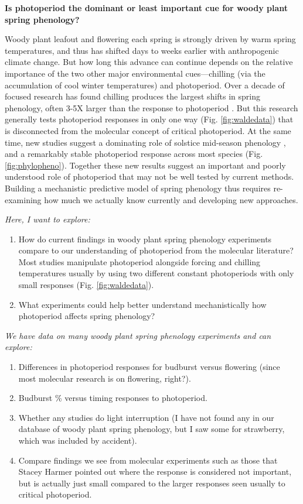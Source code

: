 \documentclass[11pt]{article}
\begin{document}
\renewcommand{\refname}{\CHead{}}

{\bf Is photoperiod the dominant or least important cue for woody plant spring phenology?} %

Woody plant leafout and flowering each spring is strongly driven by warm spring temperatures, and thus has shifted days to weeks earlier with anthropogenic climate change. But how long this advance can continue depends on the relative importance of the two other major environmental cues---chilling (via the accumulation of cool winter temperatures) and photoperiod. Over a decade of focused research \citep[e.g.,][]{laube2014gcb,ospreebbms} has found chilling produces the largest shifts in spring phenology, often 3-5X larger than the response to photoperiod \citep{morales2024phylogenetic}. But this research generally tests photoperiod responses in only one way (Fig. \ref{fig:waldedata}) that is disconnected from the molecular concept of critical photoperiod. At the same time, new studies suggest a dominating role of solstice mid-season phenology \citep{zohner2023effect,Journe2024}, and a remarkably stable photoperiod response across most species (Fig. \ref{fig:phylopheno}). Together these new results suggest an important and poorly understood role of photoperiod that may not be well tested by current methods.  Building a mechanistic predictive model of spring phenology thus requires re-examining how much we actually know currently and developing new approaches. 

\emph{Here, I want to explore:}
\begin{enumerate}
\item How do current findings in woody plant spring phenology experiments compare to our understanding of photoperiod from the molecular literature? Most studies manipulate photoperiod alongside forcing and chilling temperatures usually by using two different constant photoperiods with only small responses (Fig. \ref{fig:waldedata}). 
\item What experiments could help better understand mechanistically how photoperiod affects spring phenology?
\end{enumerate}

\emph{We have data on many woody plant spring phenology experiments and can explore:}
\begin{enumerate}
\item Differences in photoperiod responses for budburst versus flowering (since most molecular research is on flowering, right?).
\item Budburst \% versus timing responses to photoperiod.
\item Whether any studies do light interruption (I have not found any in our database of woody plant spring phenology, but I saw some for strawberry, which was included by accident). 
\item Compare findings we see from molecular experiments such as those that Stacey Harmer pointed out where the response is considered not important, but is actually just small compared to the larger responses seen usually to critical photoperiod. 
\end{enumerate}
\end{document}
